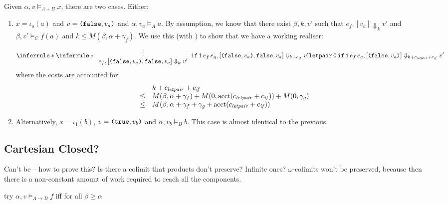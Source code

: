 \documentclass{workingnote}
\newcommand{\account}{\mathrm{acct}}
\begin{document}
Given $\alpha, v \models_{A+B} x$, there are two cases. Either:
\begin{enumerate}
\item $x = \iota_o(a)$ and $v = \texttt{(}\texttt{false},v_a\texttt{)}$ and
  $\alpha, v_a \models_A a$. By assumption, we know that there exist
  $\beta, k, v'$ such that $e_f, [v_a] \Downarrow_k v'$ and
  $\beta, v' \models_C f(a)$ and
  $k \leq M(\beta, \alpha + \gamma_f)$. We use this (with
  ) to show that we have a working realiser:
  \begin{displaymath}
    \inferrule*
    {\inferrule*
      { {\begin{array}{c} \vdots \\ e_f, [\Pair{\False,v_a}, \False, v_a] \Downarrow_k v' \end{array}}}
      {\If\,\Idx{1}\,e_f\,e_g, [\Pair{\False,v_a}, \False, v_a] \Downarrow_{k + \cnstIf} v'}
    }
    {\LetPair\,\Idx{0}\,\If\,\Idx{1}\,e_f\,e_g, [\Pair{\False,v_a}] \Downarrow_{k + \cnstLetPair + \cnstIf} v'}
  \end{displaymath}
  where the costs are accounted for:
  \begin{displaymath}
    \begin{array}{cl}
      &k + \cnstLetPair + \cnstIf \\
      \leq&M(\beta, \alpha + \gamma_f) + M(0,\account(\cnstLetPair + \cnstIf)) + M(0,\gamma_g) \\
      \leq&M(\beta, \alpha + \gamma_f + \gamma_g + \account(\cnstLetPair + \cnstIf))
    \end{array}
  \end{displaymath}
\item Alternatively, $x = \iota_1(b)$, $v = \texttt{(}\texttt{true},v_b\texttt{)}$ and
  $\alpha, v_b \models_B b$. This case is almost identical to the
  previous.
\end{enumerate}


\subsection{Cartesian Closed?}

Can't be -- how to prove this? Is there a colimit that products don't
preserve? Infinite ones? $\omega$-colimits won't be preserved, because
then there is a non-constant amount of work required to reach all the
components.

try $\alpha, v \models_{A \to B} f$ iff for all $\beta \geq \alpha$

\end{document}
